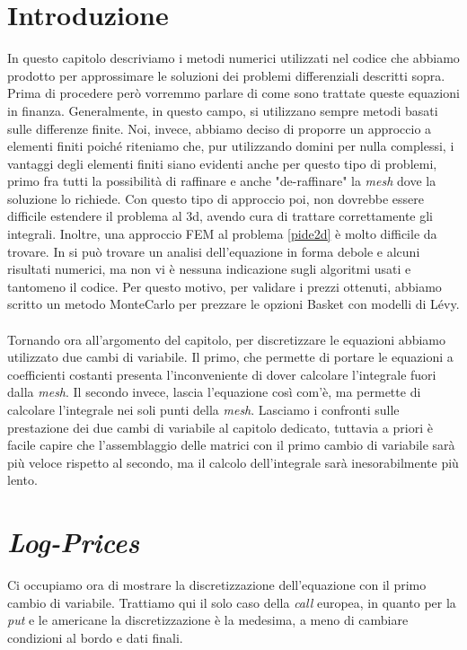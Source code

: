 \documentclass[a4paper,10pt]{report}
\theoremstyle{plain}
\theoremstyle{definition}
\theoremstyle{remark}
\begin{document}
\section{Introduzione}
In questo capitolo descriviamo i metodi numerici utilizzati nel codice che abbiamo prodotto per approssimare le soluzioni dei problemi differenziali descritti sopra. Prima di procedere per\`o vorremmo parlare di come sono trattate queste equazioni in finanza. Generalmente, in questo campo, si utilizzano sempre metodi basati sulle differenze finite. Noi, invece, abbiamo deciso di proporre un approccio a elementi finiti poich\'e riteniamo che, pur utilizzando domini per nulla complessi, i vantaggi degli elementi finiti siano evidenti anche per questo tipo di problemi, primo fra tutti la possibilit\`a di raffinare e anche "de-raffinare" la \emph{mesh} dove la soluzione lo richiede. Con questo tipo di approccio poi, non dovrebbe essere difficile estendere il problema al 3d, avendo cura di trattare correttamente gli integrali. Inoltre, una approccio FEM al problema \ref{pide2d} è molto difficile da trovare. In \cite{jinghui2009multi} si può trovare un analisi dell'equazione in forma debole e alcuni risultati numerici, ma non vi è nessuna indicazione sugli algoritmi usati e tantomeno il codice. Per questo motivo, per validare i prezzi ottenuti, abbiamo scritto un metodo MonteCarlo per prezzare le opzioni Basket con modelli di L\'evy.\\\\Tornando ora all'argomento del capitolo, per discretizzare le equazioni abbiamo utilizzato due cambi di variabile. Il primo, che permette di portare le equazioni a coefficienti costanti presenta l'inconveniente di dover calcolare l'integrale fuori dalla \emph{mesh}. Il secondo invece, lascia l'equazione cos\`i com'\`e, ma permette di calcolare l'integrale nei soli punti della \emph{mesh}. Lasciamo i confronti sulle prestazione dei due cambi di variabile al capitolo dedicato, tuttavia a priori \`e facile capire che l'assemblaggio delle matrici con il primo cambio di variabile sar\`a pi\`u veloce rispetto al secondo, ma il calcolo dell'integrale sar\`a inesorabilmente pi\`u lento.

\section{\emph{Log-Prices}}
Ci occupiamo ora di mostrare la discretizzazione dell'equazione con il primo cambio di variabile. Trattiamo qui il solo caso della \emph{call} europea, in quanto per la \emph{put} e le americane la discretizzazione \`e la medesima, a meno di cambiare condizioni al bordo e dati finali.
\end{document}
